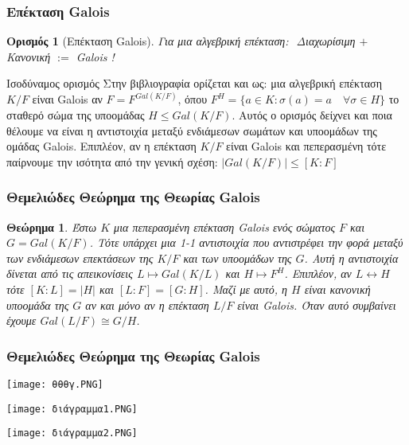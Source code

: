 \documentclass{beamer}
\newcommand {\tl}{\textlatin}
\newtheorem{thrm}{Θεώρημα}
\newtheorem*{defn}{Ορισμός}
\begin{document}
\begin{frame}
    \frametitle{Επέκταση \tl{Galois}}
    \begin{defn}[Επέκταση \tl{Galois}]
        Για μια αλγεβρική επέκταση:
        $ $\newline
        Διαχωρίσιμη $+$ Κανονική $:=$ \tl{Galois} !
    \end{defn}    
    \pause
    \begin{block}{Ισοδύναμος ορισμός}
    Στην βιβλιογραφία ορίζεται και ως: μια αλγεβρική επέκταση $K/F$ είναι \tl{Galois} αν $F = F^{Gal(K/F)}$, όπου $F^H =\{a \in K: \sigma (a) = a \quad\forall \sigma \in H\}$ το σταθερό σώμα της υποομάδας $H\leq Gal(K/F)$. Αυτός ο ορισμός δείχνει και ποια θέλουμε να είναι η αντιστοιχία μεταξύ ενδιάμεσων σωμάτων και υποομάδων της ομάδας \tl{Galois}. Επιπλέον, αν η επέκταση $K/F$ είναι \tl{Galois} και πεπερασμένη τότε παίρνουμε την ισότητα από την γενική σχέση: $|Gal(K/F)| \leq [K:F] $
    \end{block}
\end{frame}

\begin{frame}
    \frametitle{Θεμελιώδες Θεώρημα της Θεωρίας \tl{Galois}}
    \begin{thrm}
    	Έστω $K$ μια πεπερασμένη επέκταση \tl{Galois} ενός σώματος $F$ και $G=Gal(K/F)$. Τότε υπάρχει μια 1-1 αντιστοιχία που αντιστρέφει την φορά μεταξύ των ενδιάμεσων επεκτάσεων της $K/F$ και των υποομάδων της $G$. Αυτή η αντιστοιχία δίνεται από τις απεικονίσεις $L \mapsto Gal(K/L)$ και $H \mapsto F^H$. Επιπλέον, αν $L\leftrightarrow H$ τότε $[K:L] = |H|$ και $[L:F] = [G:H]$. Μαζί με αυτό, η $H$ είναι κανονική υποομάδα της $G$ αν και μόνο αν η επέκταση $L/F$ είναι \tl{Galois}. Όταν αυτό συμβαίνει έχουμε $Gal(L/F) \cong G/H$.

    \end{thrm}
\end{frame}

\begin{frame}
    \frametitle{Θεμελιώδες Θεώρημα της Θεωρίας \tl{Galois}}
    \begin{center}
        \texttt{[image: θθθγ.PNG]}
    \end{center}
\end{frame}

\begin{frame}
    \texttt{[image: διάγραμμα1.PNG]}
\end{frame}
\begin{frame}
    \texttt{[image: διάγραμμα2.PNG]}
\end{frame}
\end{document}
